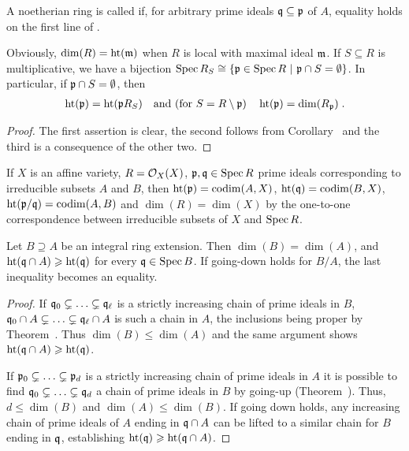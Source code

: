 \documentclass[a4paper,parskip=half,numbers=enddot, DIV=12]{scrreprt}
\renewcommand{\geq}{\geqslant}
\renewcommand{\leq}{\leqslant}
\begin{document}
	\begin{defi}
		 A noetherian ring is called  if, for arbitrary prime ideals $\mathfrak{q}\subseteq\mathfrak{p}$ of $A$, equality holds on the first line of . 
	\end{defi}
	\begin{fact}
		Obviously, $\dim (R) = \operatorname{ht}(\mathfrak{m})$ when $R$ is local with maximal ideal $\mathfrak{m}$. If $S\subseteq R$ is multiplicative, we have a bijection $\operatorname{Spec} R_S \cong \left\{\mathfrak{p}\in\operatorname{Spec} R \ \middle|\ \mathfrak{p}\cap S = \emptyset\right\}$. In particular, if $\mathfrak{p}\cap S=\emptyset$, then
		\begin{align*}
			\operatorname{ht}(\mathfrak{p} ) = \operatorname{ht}(\mathfrak{p} R_S)\quad\text{and (for }S=R\setminus\mathfrak{p})\quad \operatorname{ht}(\mathfrak{p}) = \dim (R_{\mathfrak{p}})\;.
		\end{align*}
	\end{fact}
	\begin{proof}
		The first assertion is clear, the second follows from Corollary~ and the third is a consequence of the other two.
	\end{proof}
	\begin{rem}
		If $X$ is an affine variety, $R=\mathcal{O}_X(X)$, $\mathfrak{p},\mathfrak{q}\in\operatorname{Spec} R$ prime ideals corresponding to irreducible subsets $A$ and $B$, then $\operatorname{ht}(\mathfrak{p}) = \operatorname{codim}(A,X)$, $\operatorname{ht}(\mathfrak{q}) = \operatorname{codim}(B,X)$, $\operatorname{ht}(\mathfrak{p}/\mathfrak{q}) = \operatorname{codim}(A,B)$ and $\dim (R) = \dim (X)$ by the one-to-one correspondence between irreducible subsets of $X$ and $\operatorname{Spec} R$.
	\end{rem}
	\begin{fact}
		Let $B\supseteq A$ be an integral ring extension. Then $\dim (B) = \dim (A)$, and $\hoehe(\qq\cap A) \geq \hoehe(\qq)$ for every $\mathfrak{q}\in\operatorname{Spec} B$. If going-down holds for $B/A$, the last inequality becomes an equality.
	\end{fact}
	\begin{proof}
		If $\mathfrak{q}_0\subsetneq\ldots\subsetneq \mathfrak{q}_\ell$ is a strictly increasing chain of prime ideals in $B$, $\mathfrak{q}_0\cap A\subsetneq\ldots\subsetneq \mathfrak{q}_\ell\cap A$ is such a chain in $A$, the inclusions being proper by Theorem~. Thus $\dim (B)\leq \dim (A)$ and the same argument shows $\hoehe(\qq\cap A) \geq \hoehe(\qq)$.
		
		 If $\mathfrak{p}_0\subsetneq\ldots\subsetneq \mathfrak{p}_d$ is a strictly increasing chain of prime ideals in $A$ it is possible to find $\mathfrak{q}_0\subsetneq\ldots\subsetneq \mathfrak{q}_d$ a chain  of prime ideals in $B$ by going-up (Theorem~). Thus, $d\leq \dim (B)$ and $\dim (A) \leq \dim (B)$. If going down holds, any increasing chain of prime ideals of $A$ ending in $\mathfrak{q}\cap A$ can be lifted to a similar chain for $B$ ending in $\mathfrak{q}$, establishing $\hoehe(\qq)\geq\hoehe(\qq\cap A)$.
	\end{proof}
\end{document}
